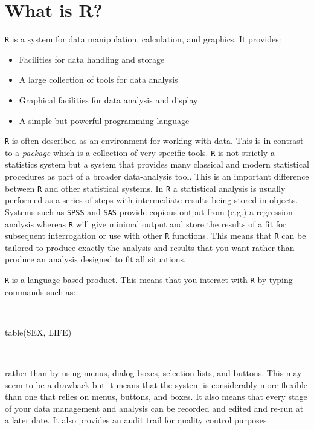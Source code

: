\documentclass[
  12pt,
]{book}
\newenvironment{Shaded}{\begin{snugshade}}{\end{snugshade}}
\newcommand{\FunctionTok}[1]{\textcolor[rgb]{0.00,0.00,0.00}{#1}}
\newcommand{\NormalTok}[1]{#1}
\begin{document}
\hypertarget{what-r}{%
\section{What is R?}\label{what-r}}

\texttt{R} is a system for data manipulation, calculation, and graphics. It provides:

\begin{itemize}
\item
  Facilities for data handling and storage
\item
  A large collection of tools for data analysis
\item
  Graphical facilities for data analysis and display
\item
  A simple but powerful programming language
\end{itemize}

\texttt{R} is often described as an environment for working with data. This is in contrast to a \emph{package} which is a collection of very specific tools. \texttt{R} is not strictly a statistics system but a system that provides many classical and modern statistical procedures as part of a broader data-analysis tool. This is an important difference between \texttt{R} and other statistical systems. In \texttt{R} a statistical analysis is usually performed as a series of steps with intermediate results being stored in objects. Systems such as \texttt{SPSS} and \texttt{SAS} provide copious output from (e.g.) a regression analysis whereas \texttt{R} will give minimal output and store the results of a fit for subsequent interrogation or use with other \texttt{R} functions. This means that \texttt{R} can be tailored to produce exactly the analysis and results that you want rather than produce an analysis designed to fit all situations.

\texttt{R} is a language based product. This means that you interact with \texttt{R} by typing commands such as:

~

\begin{Shaded}
\begin{Highlighting}[]
\FunctionTok{table}\NormalTok{(SEX, LIFE)}
\end{Highlighting}
\end{Shaded}

~

rather than by using menus, dialog boxes, selection lists, and buttons. This may seem to be a drawback but it means that the system is considerably more flexible than one that relies on menus, buttons, and boxes. It also means that every stage of your data management and analysis can be recorded and edited and re-run at a later date. It also provides an audit trail for quality control purposes.
\end{document}
